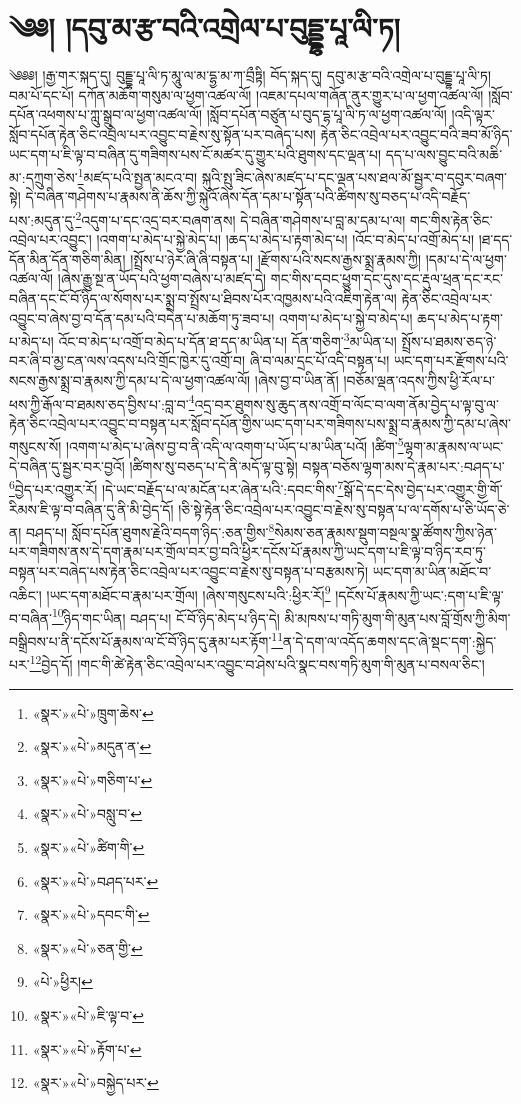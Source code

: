 \chapter{༄༅། །དབུ་མ་རྩ་བའི་འགྲེལ་པ་བུདྡྷ་པཱ་ལི་ཏ།}༄༅༅། །རྒྱ་གར་སྐད་དུ། བུདྡྷ་པཱ་ལི་ཏ་མཱུ་ལ་མ་དྷྱ་མ་ཀ་བྲྀཏྟི། བོད་སྐད་དུ། དབུ་མ་རྩ་བའི་འགྲེལ་པ་བུདྡྷ་པཱ་ལི་ཏ། བམ་པོ་དང་པོ། དཀོན་མཆོག་གསུམ་ལ་ཕྱག་འཚལ་ལོ། །འཇམ་དཔལ་གཞོན་ནུར་གྱུར་པ་ལ་ཕྱག་འཚལ་ལོ། །སློབ་དཔོན་འཕགས་པ་ཀླུ་སྒྲུབ་ལ་ཕྱག་འཚལ་ལོ། །སློབ་དཔོན་བཙུན་པ་བུད་དྷ་པཱ་ལི་ཏ་ལ་ཕྱག་འཚལ་ལོ། །འདི་ལྟར་སློབ་དཔོན་རྟེན་ཅིང་འབྲེལ་པར་འབྱུང་བ་རྗེས་སུ་སྟོན་པར་བཞེད་པས། རྟེན་ཅིང་འབྲེལ་པར་འབྱུང་བའི་ཟབ་མོ་ཉིད་ཡང་དག་པ་ཇི་ལྟ་བ་བཞིན་དུ་གཟིགས་པས་ངོ་མཚར་དུ་གྱུར་པའི་ཐུགས་དང་ལྡན་པ། དད་པ་ལས་བྱུང་བའི་མཆི་མ་:དཀྲུག་ཅེས་\footnote{«སྣར་»«པེ་»ཁྲུག་ཆེས་}མཛད་པའི་སྤྱན་མངའ་བ། སྐུའི་སྤུ་ཟིང་ཞེས་མཛད་པ་དང་ལྡན་པས་ཐལ་མོ་སྦྱར་བ་དབུར་བཞག་སྟེ། དེ་བཞིན་གཤེགས་པ་རྣམས་ནི་ཆོས་ཀྱི་སྐུའོ་ཞེས་དོན་དམ་པ་སྟོན་པའི་ཚིགས་སུ་བཅད་པ་འདི་བརྗོད་པས་:མདུན་དུ་\footnote{«སྣར་»«པེ་»མདུན་ན་}འདུག་པ་དང་འདྲ་བར་བཞག་ནས། དེ་བཞིན་གཤེགས་པ་བླ་མ་དམ་པ་ལ། གང་གིས་རྟེན་ཅིང་འབྲེལ་པར་འབྱུང་། །འགག་པ་མེད་པ་སྐྱེ་མེད་པ། །ཆད་པ་མེད་པ་རྟག་མེད་པ། །འོང་བ་མེད་པ་འགྲོ་མེད་པ། །ཐ་དད་དོན་མིན་དོན་གཅིག་མིན། །སྤྲོས་པ་ཉེར་ཞི་ཞི་བསྟན་པ། །རྫོགས་པའི་སངས་རྒྱས་སྨྲ་རྣམས་ཀྱི། །དམ་པ་དེ་ལ་ཕྱག་འཚལ་ལོ། །ཞེས་རྒྱུ་སྔ་ན་ཡོད་པའི་ཕྱག་བཞེས་པ་མཛད་དེ། གང་གིས་དབང་ཕྱུག་དང་དུས་དང་རྡུལ་ཕྲན་དང་རང་བཞིན་དང་ངོ་བོ་ཉིད་ལ་སོགས་པར་སྨྲ་བ་སྤྲོས་པ་ཐིབས་པོར་འཁྱམས་པའི་འཇིག་རྟེན་ལ། རྟེན་ཅིང་འབྲེལ་པར་འབྱུང་བ་ཞེས་བྱ་བ་དོན་དམ་པའི་བདེན་པ་མཆོག་ཏུ་ཟབ་པ། འགག་པ་མེད་པ་སྐྱེ་བ་མེད་པ། ཆད་པ་མེད་པ་རྟག་པ་མེད་པ། འོང་བ་མེད་པ་འགྲོ་བ་མེད་པ་དོན་ཐ་དད་མ་ཡིན་པ། དོན་གཅིག་\footnote{«སྣར་»«པེ་»གཅིག་པ་}མ་ཡིན་པ། སྤྲོས་པ་ཐམས་ཅད་ཉེ་བར་ཞི་བ་མྱ་ངན་ལས་འདས་པའི་གྲོང་ཁྱེར་དུ་འགྲོ་བ། ཞི་བ་ལམ་དྲང་པོ་འདི་བསྟན་པ། ཡང་དག་པར་རྫོགས་པའི་སངས་རྒྱས་སྨྲ་བ་རྣམས་ཀྱི་དམ་པ་དེ་ལ་ཕྱག་འཚལ་ལོ། །ཞེས་བྱ་བ་ཡིན་ནོ། །བཅོམ་ལྡན་འདས་ཀྱིས་ཕྱི་རོལ་པ་ཕས་ཀྱི་རྒོལ་བ་ཐམས་ཅད་བྱིས་པ་:བླ་བ་\footnote{«སྣར་»«པེ་»བསླུ་བ་}འདྲ་བར་ཐུགས་སུ་ཆུད་ནས་འགྲོ་བ་ལོང་བ་ལག་ནོམ་བྱེད་པ་ལྟ་བུ་ལ་རྟེན་ཅིང་འབྲེལ་པར་འབྱུང་བ་བསྟན་པར་སློབ་དཔོན་གྱིས་ཡང་དག་པར་གཟིགས་པས་སྨྲ་བ་རྣམས་ཀྱི་དམ་པ་ཞེས་གསུངས་སོ། །འགག་པ་མེད་པ་ཞེས་བྱ་བ་ནི་འདི་ལ་འགག་པ་ཡོད་པ་མ་ཡིན་པའོ། །ཚིག་\footnote{«སྣར་»«པེ་»ཚིག་གི་}ལྷག་མ་རྣམས་ལ་ཡང་དེ་བཞིན་དུ་སྦྱར་བར་བྱའོ། །ཚིགས་སུ་བཅད་པ་དེ་ནི་མདོ་ལྟ་བུ་སྟེ། བསྟན་བཅོས་ལྷག་མས་དེ་རྣམ་པར་:བཤད་པ་\footnote{«སྣར་»«པེ་»བཤད་པར་}བྱེད་པར་འགྱུར་རོ། །དེ་ཡང་བརྗོད་པ་ལ་མངོན་པར་ཞེན་པའི་:དབང་གིས་\footnote{«སྣར་»«པེ་»དབང་གི་}སྒོ་དེ་དང་དེས་བྱེད་པར་འགྱུར་གྱི་གོ་རིམས་ཇི་ལྟ་བ་བཞིན་དུ་ནི་མི་བྱེད་དོ། །ཅི་སྟེ་རྟེན་ཅིང་འབྲེལ་པར་འབྱུང་བ་རྗེས་སུ་བསྟན་པ་ལ་དགོས་པ་ཅི་ཡོད་ཅེ་ན། བཤད་པ། སློབ་དཔོན་ཐུགས་རྗེའི་བདག་ཉིད་:ཅན་གྱིས་\footnote{«སྣར་»«པེ་»ཅན་གྱི་}སེམས་ཅན་རྣམས་སྡུག་བསྔལ་སྣ་ཚོགས་ཀྱིས་ཉེན་པར་གཟིགས་ནས་དེ་དག་རྣམ་པར་གྲོལ་བར་བྱ་བའི་ཕྱིར་དངོས་པོ་རྣམས་ཀྱི་ཡང་དག་པ་ཇི་ལྟ་བ་ཉིད་རབ་ཏུ་བསྟན་པར་བཞེད་པས་རྟེན་ཅིང་འབྲེལ་པར་འབྱུང་བ་རྗེས་སུ་བསྟན་པ་བརྩམས་ཏེ། ཡང་དག་མ་ཡིན་མཐོང་བ་འཆིང་། །ཡང་དག་མཐོང་བ་རྣམ་པར་གྲོལ། །ཞེས་གསུངས་པའི་:ཕྱིར་རོ།\footnote{«པེ་»ཕྱིར།} །དངོས་པོ་རྣམས་ཀྱི་ཡང་:དག་པ་ཇི་ལྟ་བ་བཞིན་\footnote{«སྣར་»«པེ་»ཇི་ལྟ་བ་}ཉིད་གང་ཡིན། བཤད་པ། ངོ་བོ་ཉིད་མེད་པ་ཉིད་དེ། མི་མཁས་པ་གཏི་མུག་གི་མུན་པས་བློ་གྲོས་ཀྱི་མིག་བསྒྲིབས་པ་ནི་དངོས་པོ་རྣམས་ལ་ངོ་བོ་ཉིད་དུ་རྣམ་པར་རྟོག་\footnote{«སྣར་»«པེ་»རྟོག་པ་}ན་དེ་དག་ལ་འདོད་ཆགས་དང་ཞེ་སྡང་དག་:སྐྱེད་པར་\footnote{«སྣར་»«པེ་»བསྐྱེད་པར་}བྱེད་དོ། །གང་གི་ཚེ་རྟེན་ཅིང་འབྲེལ་པར་འབྱུང་བ་ཤེས་པའི་སྣང་བས་གཏི་མུག་གི་མུན་པ་བསལ་ཅིང་། 